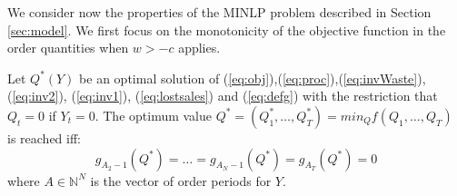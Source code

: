 We consider now the properties of the MINLP problem described in Section \ref{sec:model}. We first focus on the monotonicity of the objective function in the order quantities when $w>-c$ applies.



%



\begin{proposition}
\label{prop:optimizeY}
Let $Q^*(Y)$ be an optimal solution of (\ref{eq:obj}),(\ref{eq:proc}),(\ref{eq:invWaste}), (\ref{eq:inv2}), (\ref{eq:inv1}), (\ref{eq:lostsales}) and (\ref{eq:defg}) with the restriction that $Q_t= 0$ if $Y_t=0$.  The optimum value $Q^* =(Q_1^*,\ldots, Q_{T}^*)= min_Q f(Q_1 ,\ldots, Q_{T})$ is reached iff:
\begin{equation}
\label{eq:optimalQ}
 g_{A_2-1}(Q^*) = \ldots = g_{A_N-1}(Q^*)= g_{A_T}(Q^*)=0 %
\end{equation}
where $A \in \mathbb{N}^N$ is the vector of order periods for $Y$.
\end{proposition}




